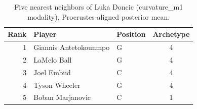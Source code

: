 \begin{table}[htbp]
  \centering\small
  \begin{tabular}{rllc}
    \toprule
    Rank & Player & Position & Archetype \\
    \midrule
    1 & Giannis Antetokounmpo & G & 4 \\
    2 & LaMelo Ball & G & 4 \\
    3 & Joel Embiid & C & 4 \\
    4 & Tyson Wheeler & G & 4 \\
    5 & Boban Marjanovic & C & 1 \\
    \bottomrule
  \end{tabular}
  \caption{Five nearest neighbors of Luka Doncic (curvature_m1 modality), Procrustes-aligned posterior mean.}
  \label{tab:Luka_Doncic_neighbors_curvature_m1}
\end{table}

